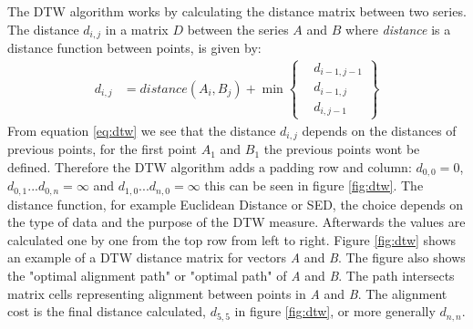 The DTW algorithm works by calculating the distance matrix between two series. The distance $d_{i,j}$ in a matrix $D$ between the series $A$ and $B$ where \textit{distance} is a distance function between points, is given by:
\begin{equation}
    \label{eq:dtw}
    \begin{aligned}
        d_{i, j} & = distance(A_{i}, B_{j}) + \min \left\{ \begin{aligned}
                                                                & d_{i-1, j-1} \\
                                                                & d_{i-1, j}   \\
                                                                & d_{i, j-1}
                                                           \end{aligned} \right\}
    \end{aligned}
\end{equation}
From equation \ref{eq:dtw} we see that the distance $d_{i, j}$ depends on the distances of previous points, for the first point $A_{1}$ and $B_{1}$ the previous points wont be defined. Therefore the DTW algorithm adds a padding row and column: $d_{0,0} = 0$, $d_{0, 1}...d_{0, n} = \infty$ and $d_{1, 0}...d_{n, 0} = \infty$ this can be seen in figure \ref{fig:dtw}. The distance function, for example Euclidean Distance or SED, the choice depends on the type of data and the purpose of the DTW measure. Afterwards the values are calculated one by one from the top row from left to right. Figure \ref{fig:dtw} shows an example of a DTW distance matrix for vectors \textit{A} and \textit{B}. The figure also shows the "optimal alignment path" or "optimal path" of \textit{A} and \textit{B}. The path intersects matrix cells representing alignment between points in \textit{A} and \textit{B}. The alignment cost is the final distance calculated, $d_{5,5}$ in figure \ref{fig:dtw}, or more generally $d_{n,n}$.

